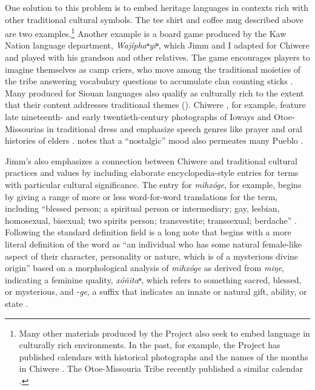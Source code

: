 \documentclass[output=paper]{LSP/langsci}
\begin{document}
One solution to this problem is to embed heritage languages in contexts rich with other traditional cultural symbols. The tee shirt and coffee mug described above are two examples.\footnote{Many other materials produced by the Project also seek to embed language in culturally rich environments. In the past, for example, the Project has published calendars with historical photographs and the names of the months in Chiwere \citep{Goodtracks1985}. The Otoe-Missouria Tribe recently published a similar calendar \citep{OtoeMissouriaLD2014}.}  Another example is a board game produced by the Kaw Nation language department, \emph{Wajíphaⁿyiⁿ}, which Jimm and I adapted for Chiwere and played with his grandson and other relatives. The game encourages players to imagine themselves as camp criers, who move among the traditional moieties of the tribe answering vocabulary questions to accumulate clan counting sticks \citep{KanzaLP2004}. Many  produced for Siouan languages also qualify as culturally rich to the extent that their content addresses traditional themes (\citealt[e.g.][]{HartmannMarschke2010, KanzaLP2010}). Chiwere , for example, feature late nineteenth- and early twentieth-century photographs of Ioways and Otoe-Missourias in traditional dress and emphasize speech genres like prayer and oral histories of elders \citep{OtoeIowaWistrandRobinson1977, OtoeIowaWistrandRobinson1978}.  notes that a ``nostalgic'' mood also permeates many Pueblo .

Jimm's  also emphasizes a connection between Chiwere and traditional cultural practices and values by including elaborate encyclopedia-style entries for terms with particular cultural significance. The entry for \emph{mihxóge}, for example, begins by giving a range of more or less word-for-word  translations for the term, including ``blessed person; a spiritual person or intermediary; gay, lesbian, homosexual, bisexual; two spirits person; transvestite; transsexual; berdache'' \citep[6]{Goodtracks2008}. Following the standard definition field is a long note that begins with a more literal definition of the word as ``an individual who has some natural female-like aspect of their character, personality or nature, which is of a mysterious divine origin'' based on a morphological analysis of \emph{mihxóge} as derived from \emph{miŋe}, indicating a feminine quality, \emph{xóñitaⁿ}, which refers to something sacred, blessed, or mysterious, and -\emph{ge}, a suffix that indicates an innate or natural gift, ability, or state \citep[6]{Goodtracks2008}.
\end{document}
